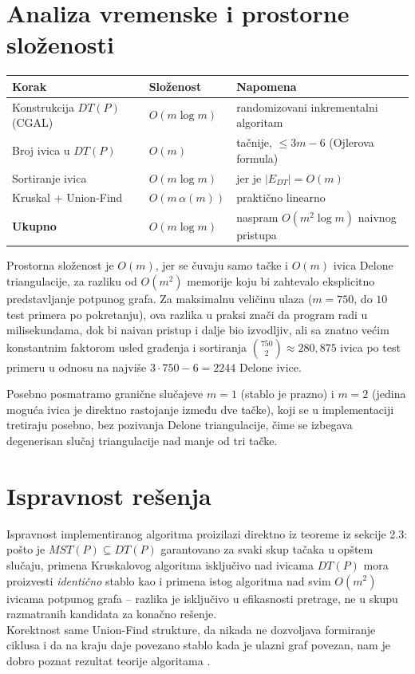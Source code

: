 \documentclass[11pt]{article}
\theoremstyle{definition}
\begin{document}
\section{Analiza vremenske i prostorne složenosti}

\begin{center}
\begin{tabular}{@{}lll@{}}
\toprule
\textbf{Korak} & \textbf{Složenost} & \textbf{Napomena} \\
\midrule
Konstrukcija $DT(P)$ (CGAL) & $O(m \log m)$ & randomizovani inkrementalni algoritam \\
Broj ivica u $DT(P)$ & $O(m)$ & tačnije, $\le 3m-6$ (Ojlerova formula) \\
Sortiranje ivica & $O(m \log m)$ & jer je $|E_{DT}| = O(m)$ \\
Kruskal + Union-Find & $O(m\,\alpha(m))$ & praktično linearno \\
\midrule
\textbf{Ukupno} & $O(m \log m)$ & naspram $O(m^2 \log m)$ naivnog pristupa \\
\bottomrule
\end{tabular}
\end{center}

Prostorna složenost je $O(m)$, jer se čuvaju samo tačke i $O(m)$ ivica Delone triangulacije, za razliku od $O(m^2)$ memorije koju bi zahtevalo eksplicitno predstavljanje potpunog grafa. Za maksimalnu veličinu ulaza ($m = 750$, do $10$ test primera po pokretanju), ova razlika u praksi znači da program radi u milisekundama, dok bi naivan pristup i dalje bio izvodljiv, ali sa znatno većim konstantnim faktorom usled građenja i sortiranja $\binom{750}{2} \approx 280{,}875$ ivica po test primeru u odnosu na najviše $3 \cdot 750 - 6 = 2244$ Delone ivice.

Posebno posmatramo granične slučajeve $m=1$ (stablo je prazno) i $m=2$ (jedina moguća ivica je direktno rastojanje između dve tačke), koji se u implementaciji tretiraju posebno, bez pozivanja Delone triangulacije, čime se izbegava degenerisan slučaj triangulacije nad manje od tri tačke.

\section{Ispravnost rešenja}

Ispravnost implementiranog algoritma proizilazi direktno iz teoreme iz sekcije 2.3: pošto je $MST(P) \subseteq DT(P)$ garantovano za svaki skup tačaka u opštem slučaju, primena Kruskalovog algoritma isključivo nad ivicama $DT(P)$ mora proizvesti \emph{identično} stablo kao i primena istog algoritma nad svim $O(m^2)$ ivicama potpunog grafa -- razlika je isključivo u efikasnosti pretrage, ne u skupu razmatranih kandidata za konačno rešenje. \\
Korektnost same Union-Find strukture, da nikada ne dozvoljava formiranje ciklusa i da na kraju daje povezano stablo kada je ulazni graf povezan, nam je dobro poznat rezultat teorije algoritama \cite{cormen}.
\end{document}
